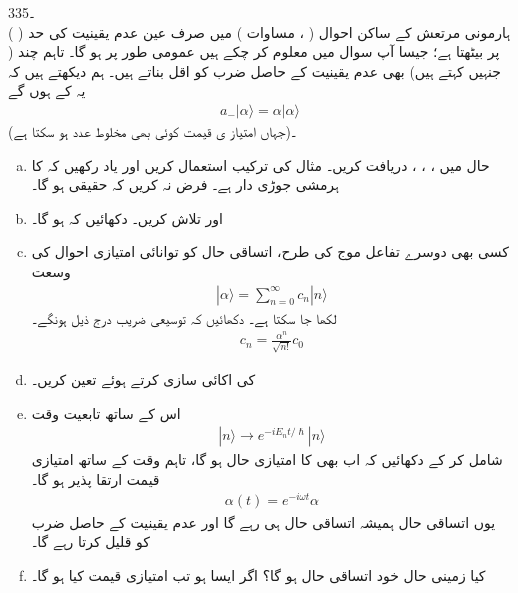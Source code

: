 3۔35\\
 \quad ہارمونی مرتعش کے ساکن احوال ( ، مساوات ) میں صرف  عین عدم یقینیت کی
 حد ( ) پر بیٹھتا ہے؛ جیسا آپ سوال  میں معلوم کر چکے ہیں عمومی طور پر  ہو گا۔ تاہم چند  ( جنہیں کہتے ہیں) بھی عدم یقینیت کے حاصل ضرب کو اقل بناتے ہیں۔ ہم دیکھتے ہیں کہ یہ  کے  ہوں گے
\begin{align*}
a_{-}|\alpha\rangle =\alpha|\alpha\rangle
\end{align*}
(جہاں امتیاز ی قیمت  کوئی بھی مخلوط عدد ہو سکتا ہے)۔
\begin{enumerate}[a.] 
\item
حال  میں ، ، ،  دریافت کریں۔  مثال  کی ترکیب استعمال کریں اور یاد رکھیں کہ  کا ہرمشی جوڑی دار  ہے۔ فرض نہ کریں کہ  حقیقی ہو گا۔ 
\item
{} اور  تلاش کریں۔ دکھائیں کہ  ہو گا۔ 
\item
کسی بھی دوسرے تفاعل موج کی طرح، اتساقی حال کو توانائی امتیازی احوال کی وسعت 
 \begin{align*} 
|\alpha\rangle=\sum_{n=0}^{\infty}c_{n}|n\rangle 
 \end{align*} 
 لکھا جا سکتا ہے۔ دکھائیں کہ توسیعی  ضریب  درج ذیل ہونگے۔ 
 \begin{align*} 
c_{n}=\frac{\alpha^{n}}{\sqrt{n!}}c_{0} 
 \end{align*} 
\item
  کی اکائی سازی کرتے ہوئے  تعین کریں۔  
 \item
 اس کے ساتھ تابعیت وقت 
 \begin{align*} 
|n\rangle\to e^{-iE_{n}t/\hslash}|n\rangle 
 \end{align*} 
شامل کر کے دکھائیں کہ  اب بھی  کا امتیازی حال ہو گا، تاہم وقت کے ساتھ امتیازی قیمت ارتقا پذیر ہو گا۔ 
 \begin{align*} 
\alpha(t)=e^{-i\omega t}\alpha 
 \end{align*} 
یوں اتساقی حال ہمیشہ اتساقی حال ہی رہے گا اور عدم یقینیت کے حاصل ضرب کو قلیل  کرتا رہے گا۔ 
\item
کیا زمینی حال  خود اتساقی حال ہو گا؟ اگر ایسا ہو تب امتیازی قیمت کیا ہو گا۔
\end{enumerate}

